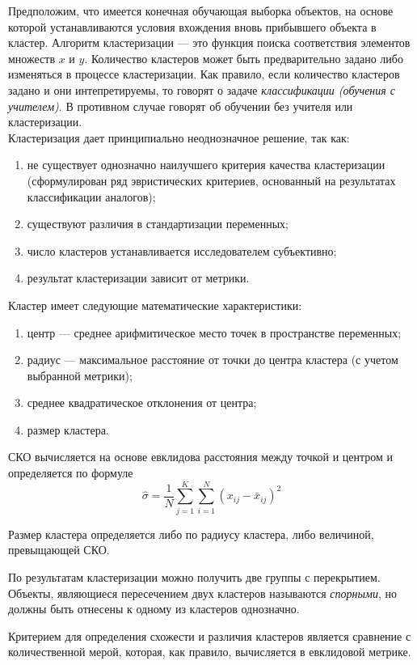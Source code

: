 \documentclass[12pt]{article}
\begin{document}
Предположим, что имеется конечная обучающая выборка объектов, на основе которой устанавливаются условия вхождения вновь прибывшего объекта в кластер. Алгоритм кластеризации --- это функция поиска соответствия элементов множеств $x$ и $y$. Количество кластеров может быть предварительно задано либо изменяться в процессе кластеризации. Как правило, если количество кластеров задано и они интепретируемы, то говорят о задаче \emph{классификации (обучения с учителем)}. В противном случае говорят об обучении без учителя или кластеризации.\\

Кластеризация дает принципиально неоднозначное решение, так как:
\begin{enumerate}
    \item не существует однозначно наилучшего критерия качества кластеризации (сформулирован ряд эвристических критериев, основанный на результатах классификации аналогов);
    \item существуют различия в стандартизации переменных;
    \item число кластеров устанавливается исследователем субъективно;
    \item результат кластеризации зависит от метрики.\\
\end{enumerate}
Кластер имеет следующие математические характеристики: 
\begin{enumerate}
    \item центр --- среднее арифмитическое место точек в пространстве переменных; 
    \item радиус --- максимальное расстояние от точки до центра кластера (с учетом выбранной метрики);
    \item среднее квадратическое отклонения от центра;
    \item размер кластера.
\end{enumerate}

СКО вычисляется на основе евклидова расстояния между точкой и центром и определяется по формуле
\[ \hat{\sigma} = \frac{1}{N} \sum_{j=1}^K \sum_{i=1}^N (x_{ij} - \bar{x}_{ij})^2\]

Размер кластера определяется либо по радиусу кластера, либо величиной, превыщающей СКО.

По результатам кластеризации можно получить две группы с перекрытием. Объекты, являющиеся пересечением двух кластеров называются \emph{спорными}, но должны быть отнесены к одному из кластеров однозначно.

Критерием для определения схожести и различия кластеров является сравнение с количественной мерой, которая, как правило, вычисляется в евклидовой метрике.
\end{document}
